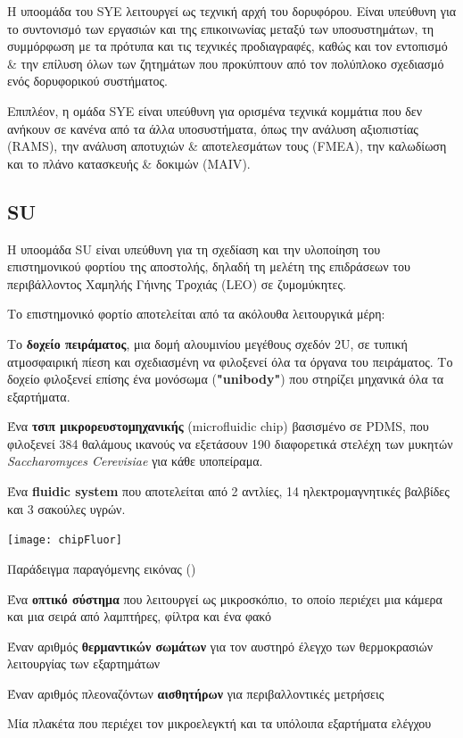 \documentclass[a4paper,nobib]{tufte-book}
\begin{document}
Η υποομάδα του \acl{SYE} λειτουργεί ως τεχνική αρχή του δορυφόρου. Είναι υπεύθυνη για το συντονισμό των εργασιών και της επικοινωνίας μεταξύ των υποσυστημάτων, τη συμμόρφωση με τα πρότυπα και τις τεχνικές προδιαγραφές, καθώς και τον εντοπισμό \& την επίλυση όλων των ζητημάτων που προκύπτουν από τον πολύπλοκο σχεδιασμό ενός δορυφορικού συστήματος.

Επιπλέον, η ομάδα \ac{SYE} είναι υπεύθυνη για ορισμένα τεχνικά κομμάτια που δεν ανήκουν σε κανένα από τα άλλα υποσυστήματα, όπως την ανάλυση αξιοπιστίας (\acs{RAMS}), την ανάλυση αποτυχιών \& αποτελεσμάτων τους (\ac{FMEA}), την καλωδίωση και το πλάνο κατασκευής \& δοκιμών (\acs{MAIV}).

\subsection{\acf{SU}}

Η υποομάδα \acl{SU} είναι υπεύθυνη για τη σχεδίαση και την υλοποίηση του επιστημονικού φορτίου της αποστολής, δηλαδή τη μελέτη της επιδράσεων του περιβάλλοντος Χαμηλής Γήινης Τροχιάς (\ac{LEO}) σε ζυμομύκητες.

Το επιστημονικό φορτίο αποτελείται από τα ακόλουθα λειτουργικά μέρη: \autocite{DDJF_PL}
\begin{compactitem}
	\item Το \textbf{δοχείο πειράματος}, μια δομή αλουμινίου μεγέθους σχεδόν 2U, σε τυπική ατμοσφαιρική πίεση και σχεδιασμένη να φιλοξενεί όλα τα όργανα του πειράματος. Το δοχείο φιλοξενεί επίσης ένα μονόσωμα (\textbf{"unibody"}) που στηρίζει μηχανικά όλα τα εξαρτήματα.
	\item Ένα \textbf{τσιπ μικρορευστομηχανικής} (microfluidic chip) βασισμένο σε \ac{PDMS}, που φιλοξενεί 384 θαλάμους ικανούς να εξετάσουν 190 διαφορετικά στελέχη των μυκητών \emph{Saccharomyces Cerevisiae} για κάθε υποπείραμα.
	\item Ένα \textbf{fluidic system} που αποτελείται από 2 αντλίες, 14 ηλεκτρομαγνητικές βαλβίδες και 3 σακούλες υγρών.
	\begin{marginfigure}
		\texttt{[image: chipFluor]}
		\caption[Παράδειγμα παραγόμενης εικόνας]{Παράδειγμα παραγόμενης εικόνας (\parencite{DDJF_PL})}
		\label{fig:chip_fluor}
	\end{marginfigure}
	\item Ένα \textbf{οπτικό σύστημα} που λειτουργεί ως μικροσκόπιο, το οποίο περιέχει μια κάμερα και μια σειρά από λαμπτήρες, φίλτρα και ένα φακό
	\item Έναν αριθμός \textbf{θερμαντικών σωμάτων} για τον αυστηρό έλεγχο των θερμοκρασιών λειτουργίας των εξαρτημάτων
	\item Έναν αριθμός πλεοναζόντων \textbf{αισθητήρων} για περιβαλλοντικές μετρήσεις
	\item Μία πλακέτα που περιέχει τον μικροελεγκτή και τα υπόλοιπα εξαρτήματα ελέγχου
\end{compactitem}
\end{document}
